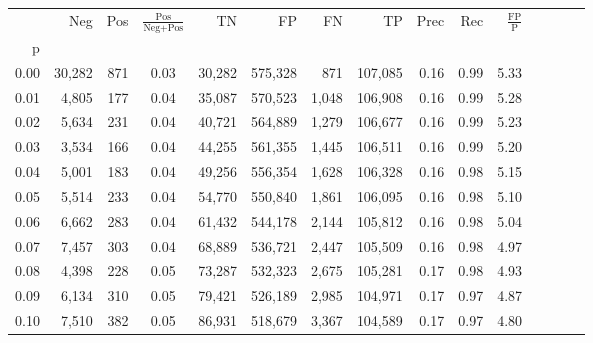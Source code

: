 \begin{tabular}{rrrcrrrrrrrrrrr}
\toprule
{} &     Neg &    Pos & $\frac{\text{Pos}}{\text{Neg}+\text{Pos}}$ &       TN &       FP &       FN &       TP &  Prec &   Rec & $\frac{\text{FP}}{\text{P}}$ \\
p    &         &        &                                            &          &          &          &          &       &       &                              \\
\midrule
0.00 &  30,282 &    871 &                                       0.03 &   30,282 &  575,328 &      871 &  107,085 &  0.16 &  0.99 &                         5.33 \\
0.01 &   4,805 &    177 &                                       0.04 &   35,087 &  570,523 &    1,048 &  106,908 &  0.16 &  0.99 &                         5.28 \\
0.02 &   5,634 &    231 &                                       0.04 &   40,721 &  564,889 &    1,279 &  106,677 &  0.16 &  0.99 &                         5.23 \\
0.03 &   3,534 &    166 &                                       0.04 &   44,255 &  561,355 &    1,445 &  106,511 &  0.16 &  0.99 &                         5.20 \\
0.04 &   5,001 &    183 &                                       0.04 &   49,256 &  556,354 &    1,628 &  106,328 &  0.16 &  0.98 &                         5.15 \\
0.05 &   5,514 &    233 &                                       0.04 &   54,770 &  550,840 &    1,861 &  106,095 &  0.16 &  0.98 &                         5.10 \\
0.06 &   6,662 &    283 &                                       0.04 &   61,432 &  544,178 &    2,144 &  105,812 &  0.16 &  0.98 &                         5.04 \\
0.07 &   7,457 &    303 &                                       0.04 &   68,889 &  536,721 &    2,447 &  105,509 &  0.16 &  0.98 &                         4.97 \\
0.08 &   4,398 &    228 &                                       0.05 &   73,287 &  532,323 &    2,675 &  105,281 &  0.17 &  0.98 &                         4.93 \\
0.09 &   6,134 &    310 &                                       0.05 &   79,421 &  526,189 &    2,985 &  104,971 &  0.17 &  0.97 &                         4.87 \\
0.10 &   7,510 &    382 &                                       0.05 &   86,931 &  518,679 &    3,367 &  104,589 &  0.17 &  0.97 &                         4.80 \\

\end{tabular}

